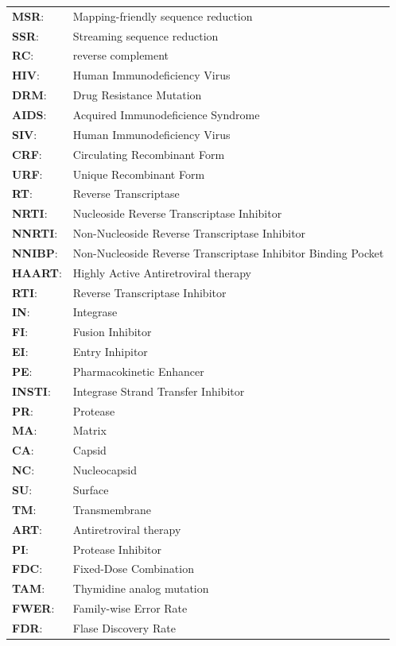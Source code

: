 \documentclass[
  11pt,
  twoside,
  BCOR=10mm,
  listof=totoc]{scrbook}
\begin{document}
\begin{tabular}{ll}
\textbf{MSR}:& Mapping-friendly sequence reduction \\
\textbf{SSR}:& Streaming sequence reduction \\
\textbf{RC}:& reverse complement \\
\textbf{HIV}:& Human Immunodeficiency Virus  \\
\textbf{DRM}:& Drug Resistance Mutation  \\
\textbf{AIDS}:& Acquired Immunodeficience Syndrome  \\
\textbf{SIV}:& Human Immunodeficiency Virus  \\
\textbf{CRF}:& Circulating Recombinant Form  \\
\textbf{URF}:& Unique Recombinant Form  \\
\textbf{RT}:& Reverse Transcriptase  \\
\textbf{NRTI}:& Nucleoside Reverse Transcriptase Inhibitor  \\
\textbf{NNRTI}:& Non-Nucleoside Reverse Transcriptase Inhibitor  \\
\textbf{NNIBP}:& Non-Nucleoside Reverse Transcriptase Inhibitor Binding Pocket  \\
\textbf{HAART}:& Highly Active Antiretroviral therapy  \\
\textbf{RTI}:& Reverse Transcriptase Inhibitor  \\
\textbf{IN}:& Integrase  \\
\textbf{FI}:& Fusion Inhibitor  \\
\textbf{EI}:& Entry Inhipitor  \\
\textbf{PE}:& Pharmacokinetic Enhancer  \\
\textbf{INSTI}:& Integrase Strand Transfer Inhibitor  \\
\textbf{PR}:& Protease  \\
\textbf{MA}:& Matrix  \\
\textbf{CA}:& Capsid  \\
\textbf{NC}:& Nucleocapsid  \\
\textbf{SU}:& Surface  \\
\textbf{TM}:& Transmembrane  \\
\textbf{ART}:& Antiretroviral therapy  \\
\textbf{PI}:& Protease Inhibitor  \\
\textbf{FDC}:& Fixed-Dose Combination  \\
\textbf{TAM}:& Thymidine analog mutation  \\
\textbf{FWER}:& Family-wise Error Rate  \\
\textbf{FDR}:& Flase Discovery Rate  \\

\end{tabular}
\end{document}
